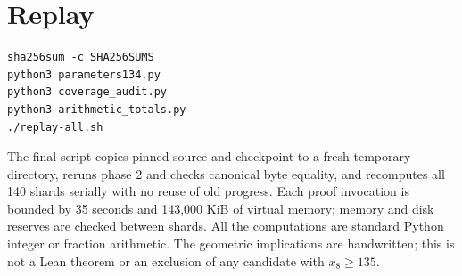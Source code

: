 \documentclass[11pt,letterpaper]{article}
\begin{document}
\section{Replay}\label{replay}

\begin{verbatim}
sha256sum -c SHA256SUMS
python3 parameters134.py
python3 coverage_audit.py
python3 arithmetic_totals.py
./replay-all.sh
\end{verbatim}

The final script copies pinned source and checkpoint to a fresh
temporary directory, reruns phase 2 and checks canonical byte equality,
and recomputes all 140 shards serially with no reuse of old progress.
Each proof invocation is bounded by 35 seconds and 143,000 KiB of
virtual memory; memory and disk reserves are checked between shards. All
the computations are standard Python integer or fraction arithmetic. The
geometric implications are handwritten; this is not a Lean theorem or an
exclusion of any candidate with \(x_8\ge135\).
\end{document}
